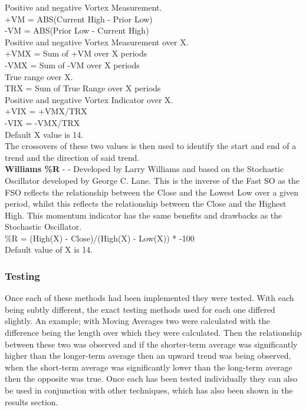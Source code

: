 \documentclass[conference]{IEEEtran}
\begin{document}
\noindent
Positive and negative Vortex Measurement.\\
+VM = ABS(Current High - Prior Low)\\
-VM = ABS(Prior Low - Current High)\\

\noindent
Positive and negative Vortex Measurement over X.\\
+VMX = Sum of +VM over X periods \\
-VMX = Sum of -VM over X periods \\

\noindent
True range over X.\\
TRX = Sum of True Range over X periods \\

\noindent
Positive and negative Vortex Indicator over X.\\
+VIX = +VMX/TRX \\
-VIX = -VMX/TRX \\

\noindent
Default X value is 14.\\

\noindent
The crossovers of these two values is then used to identify the start and end of a trend and the direction of said trend.\\

\noindent
\textbf{Williams \%R} - \cite{Murphy1999} - Developed by Larry Williams and based on the Stochastic Oscillator developed by George C. Lane. This is the inverse of the Fast SO as the FSO reflects the relationship between the Close and the Lowest Low over a given period, whilst this reflects the relationship between the Close and the Highest High. This momentum indicator has the same benefits and drawbacks as the Stochastic Oscillator.\\

\noindent
\%R = (High(X) - Close)/(High(X) - Low(X)) * -100\\
Default value of X is 14.\\

\subsubsection{Testing}

Once each of these methods had been implemented they were tested. With each being subtly different, the exact testing methods used for each one differed slightly. An example; with Moving Averages two were calculated with the difference being the length over which they were calculated. Then the relationship between these two was observed and if the shorter-term average was significantly higher than the longer-term average then an upward trend was being observed, when the short-term average was significantly lower than the long-term average then the opposite was true. Once each has been tested individually they can also be used in conjunction with other techniques, which has also been shown in the results section. 
\end{document}
